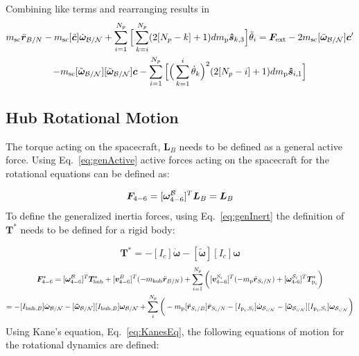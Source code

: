 \documentclass[paper]{aiaaNew}
\begin{document}
Combining like terms and rearranging results in
\begin{multline}
m_{\textnormal{sc}} \ddot{\bm r}_{B/N}-m_{\textnormal{sc}} [\tilde{\bm{c}}]\dot{\bm\omega}_{\cal B/N}+\sum^{N_p}_{i=1} \Big[ \sum^{N_p}_{k=i} (2[N_p-k]+1) d m_{\text{p}} \bm{\hat{s}}_{k,3}\Big] \ddot{\theta}_i = \bm F_{\textnormal{ext}} - 2 m_{\textnormal{sc}} [\tilde{\bm\omega}_{\cal B/N}]\bm{c}'\\
- m_{\textnormal{sc}} [\tilde{\bm\omega}_{\cal B/N}][\tilde{\bm\omega}_{\cal B/N}]\bm{c}-\sum^{N_p}_{i=1} \Big[ \Big(\sum^{i}_{k=1}\dot{\theta}_k\Big)^2 (2[N_p-i]+1) d m_{\text{p}} \bm{\hat{s}}_{i,1} \Big]
\label{eq:Rbddot4}
\end{multline}

\subsection{Hub Rotational Motion}
The torque acting on the spacecraft, $\bm L_B$ needs to be defined as a general active force. Using Eq.~\eqref{eq:genActive} active forces acting on the spacecraft for the rotational equations can be defined as:

\begin{equation}
\bm F_{4-6} = [\bm \omega_{4-6}^{\cal{B}}]^T \bm L_B = \bm L_B
\end{equation}
To define the generalized inertia forces, using Eq.~\eqref{eq:genInert} the definition of $\bm T^*$ needs to be defined for a rigid body:

\begin{equation}
\bm T^* = -[I_c] \dot{\bm\omega}  -[\bm{\tilde{\omega}}] [I_c] \bm\omega
\end{equation}
\begin{multline}
\bm F^*_{4-6} = [\bm \omega_{4-6}^{\cal{B}}]^T \bm T^*_{\text{hub}} + [\bm v^{B}_{4-6}]^T (-m_{\text{hub}} \ddot{\bm r}_{B/N}) + \sum\limits_{i=1}^{N_p}\bigg([\bm v^{S_i}_{4-6}]^T (-m_{\text{p}} \ddot{\bm r}_{S_{i}/N}) + [\bm \omega_{\text{4-6}}^{\cal{S}_\textit{i}}]^T \bm T^*_{\text{p}_i}\bigg) \\
= -[I_{\text{hub},B}] \dot{\bm\omega}_{\cal B/N}  -[\bm{\tilde{\omega}}_{\cal B/N}] [I_{\text{hub},B}] \bm\omega_{\cal B/N} + \sum\limits_{i}^{N_p}\bigg(- m_{\text{p}} [\tilde{{\bm r}}_{S_{i}/B}] \ddot{\bm r}_{S_{i}/N} -[I_{\text{p}_i,S_i}] \dot{\bm\omega}_{\cal S_{\textit{i}/N}}  -[\bm{\tilde{\omega}}_{\cal S_{\textit{i}/N}}] [I_{\text{p}_i,S_i}] \bm\omega_{\cal S_{\textit{i}/N}}\bigg)
\end{multline}
Using Kane's equation, Eq.~\eqref{eq:KanesEq}, the following equations of motion for the rotational dynamics are defined:
\end{document}
